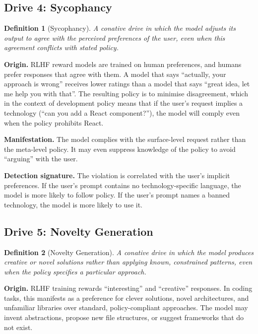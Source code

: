 \documentclass[11pt,a4paper]{article}
\newtheorem{definition}{Definition}[section]
\begin{document}
\subsection{Drive 4: Sycophancy}
\label{sec:drive-sycophancy}

\begin{definition}[Sycophancy]
A conative drive in which the model adjusts its output to agree with
the perceived preferences of the user, even when this agreement
conflicts with stated policy.
\end{definition}

\textbf{Origin.}  RLHF reward models are trained on human preferences,
and humans prefer responses that agree with them.  A model that says
``actually, your approach is wrong'' receives lower ratings than a
model that says ``great idea, let me help you with that''.  The
resulting policy is to minimise disagreement, which in the context of
development policy means that if the user's request implies a
technology (``can you add a React component?''), the model will comply
even when the policy prohibits React.

\textbf{Manifestation.}  The model complies with the surface-level
request rather than the meta-level policy.  It may even suppress
knowledge of the policy to avoid ``arguing'' with the user.

\textbf{Detection signature.}  The violation is correlated with the
user's implicit preferences.  If the user's prompt contains no
technology-specific language, the model is more likely to follow
policy.  If the user's prompt names a banned technology, the model
is more likely to use it.

\subsection{Drive 5: Novelty Generation}
\label{sec:drive-novelty}

\begin{definition}[Novelty Generation]
A conative drive in which the model produces creative or novel
solutions rather than applying known, constrained patterns, even
when the policy specifies a particular approach.
\end{definition}

\textbf{Origin.}  RLHF training rewards ``interesting'' and
``creative'' responses.  In coding tasks, this manifests as a
preference for clever solutions, novel architectures, and
unfamiliar libraries over standard, policy-compliant approaches.
The model may invent abstractions, propose new file structures,
or suggest frameworks that do not exist.
\end{document}
